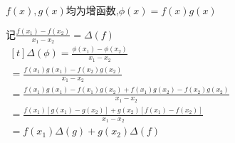 \documentclass[class=ctexart,crop=false]{standalone}
\begin{document}
$f(x),g(x)$均为增函数,$\phi(x)=f(x)g(x)$

记$\frac{f(x_1)-f(x_2)}{x_1-x_2}=\Delta(f)$\\
$\begin{aligned}[t]
        \Delta(\phi)=
        \frac{\phi(x_1)-\phi(x_2)}{x_1-x_2}                                  \\
        =\frac{f(x_1)g(x_1)-f(x_2)g(x_2)}{x_1-x_2}                           \\
        =\frac{f(x_1)g(x_1)-f(x_1)g(x_2)+f(x_1)g(x_2)-f(x_2)g(x_2)}{x_1-x_2} \\
        =\frac{f(x_1)[g(x_1)-g(x_2)]+g(x_2)[f(x_1)-f(x_2)]}{x_1-x_2}         \\
        =f(x_1)\Delta(g)+g(x_2)\Delta(f)
    \end{aligned}$
\end{document}
